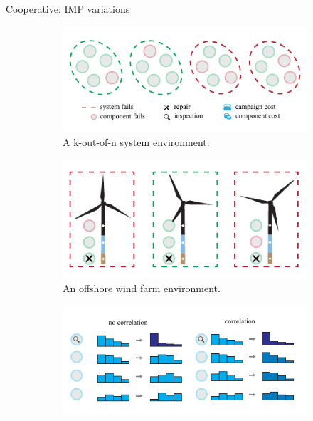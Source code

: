 \documentclass[9pt, hyperref={pdfusetitle,colorlinks=true,allcolors=DarkBlue}]{beamer}
\begin{document}
\begin{frame}{Cooperative: IMP variations}
\begin{figure}
\begin{subfigure}[t]{0.53\textwidth}
\centering
    \includegraphics[width=1\linewidth]{fig2_mul/environments_v2_a.pdf}
    \caption{A k-out-of-n system environment.}
    \label{fig:env_categories_1}
\end{subfigure}%
\begin{subfigure}[t]{0.47\textwidth}
\centering
    \includegraphics[width=1\linewidth]{fig2_mul/environments_v2_b.pdf}
    \caption{An offshore wind farm environment.}
    \label{fig:env_categories_2}
\end{subfigure}
%
\begin{subfigure}[t]{0.53\textwidth}
\centering
    \includegraphics[width=\linewidth]{fig2_mul/environments_v2_c.pdf}

\end{subfigure}
\end{figure}
\end{frame}
\end{document}

